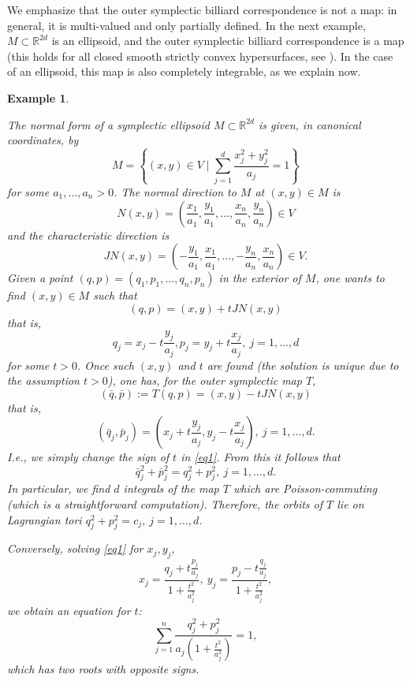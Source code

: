 \documentclass[12pt]{article}
\newtheorem{example}[lemma]{Example}
\newcommand{\R}{{\mathbb R}}
\begin{document}
We emphasize that the outer symplectic billiard correspondence is not a map: in general, it is multi-valued and only partially defined. In the next example, $M \subset \R^{2d}$ is an ellipsoid, and the outer symplectic billiard correspondence is a map (this holds for all closed smooth strictly convex hypersurfaces, see \cite{Ta1}). In the case of an ellipsoid, this map is also completely integrable, as we explain now.  

\begin{example} \label{ex:ellipsoid}
{\rm The normal form of a symplectic ellipsoid $M \subset \R^{2d}$ is given, in canonical coordinates, by
$$
M=\left\{(x,y)\in V\;\Big|\;\sum_{j=1}^d \frac{x_j^2+y_j^2}{a_j} =1\right\}
$$
for some $a_1,\ldots, a_n >0$. The normal direction to $M$ at $(x,y)\in M$ is
$$
N(x,y)=\left(\frac{x_1}{a_1}, \frac{y_1}{a_1},\ldots,\frac{x_n}{a_n}, \frac{y_n}{a_n}\right)\in V%
$$
and the characteristic direction is
$$
J N(x,y)=\left(-\frac{y_1}{a_1}, \frac{x_1}{a_1},\ldots,-\frac{y_n}{a_n}, \frac{x_n}{a_n}\right)\in V.
$$
Given a point $(q,p)=(q_1,p_1,\ldots,q_n,p_n)$ in the exterior of $M$, one wants to find $(x,y)\in M$ such that
$$
(q,p)=(x,y)+tJ N(x,y)
$$
that is,
\begin{equation} \label{eq1}
q_j=x_j-t\frac{y_j}{a_j}, p_j=y_j+t\frac{x_j}{a_j},\ j=1,\ldots,d
\end{equation}
for some $t>0$. Once such $(x,y)$ and $t$ are found (the solution is unique due to the assumption $t>0$), one has, for the outer symplectic map $T$,
$$
(\bar q,\bar p):=T(q,p)=(x,y)-tJ N(x,y)
$$
that is,
$$
(\bar q_j,\bar p_j)=\left(x_j+t\frac{y_j}{a_j}, y_j-t\frac{x_j}{a_j}\right),\ j=1,\ldots,d.
$$
I.e., we simply change the sign of $t$ in \eqref{eq1}. From this it follows that
$$
\bar q_j^2+\bar p_j^2 = q_j^2+p_j^2,\ j=1,\ldots,d.
$$
In particular, we find $d$ integrals of the map $T$ which are Poisson-commuting (which is a straightforward computation). Therefore, the orbits of $T$ lie on Lagrangian tori $q_j^2+p_j^2=c_j,\ j=1,\ldots,d$.

Conversely, solving \eqref{eq1} for $x_j,y_j$,
$$
x_j=\frac{q_j+t\frac{p_j}{a_j}}{1+\frac{t^2}{a_j^2}},\ y_j=\frac{p_j-t\frac{q_j}{a_j}}{1+\frac{t^2}{a_j^2}},
$$
we obtain an equation for $t$:
\begin{equation*} 
\sum_{j=1}^n \frac{q_j^2+p_j^2}{a_j\left(1+\frac{t^2}{a_j^2}\right)}=1,
\end{equation*}
which has two roots with opposite signs.
}
\end{example}
\end{document}
